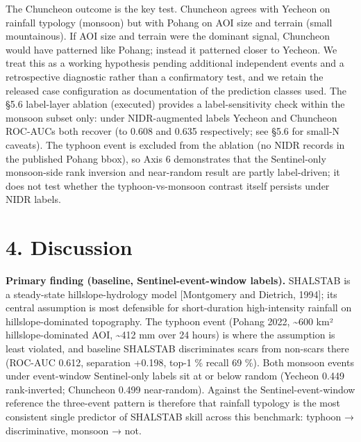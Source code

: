 \documentclass[11pt,a4paper]{article}
\begin{document}
The Chuncheon outcome is the key test. Chuncheon agrees with Yecheon on rainfall typology (monsoon) but with Pohang on AOI size and terrain (small mountainous). If AOI size and terrain were the dominant signal, Chuncheon would have patterned like Pohang; instead it patterned closer to Yecheon. We treat this as a working hypothesis pending additional independent events and a retrospective diagnostic rather than a confirmatory test, and we retain the released case configuration as documentation of the prediction classes used. The §5.6 label-layer ablation (executed) provides a label-sensitivity check within the monsoon subset only: under NIDR-augmented labels Yecheon and Chuncheon ROC-AUCs both recover (to 0.608 and 0.635 respectively; see §5.6 for small-N caveats). The typhoon event is excluded from the ablation (no NIDR records in the published Pohang bbox), so Axis 6 demonstrates that the Sentinel-only monsoon-side rank inversion and near-random result are partly label-driven; it does not test whether the typhoon-vs-monsoon contrast itself persists under NIDR labels.

\section{4. Discussion}\label{discussion}

\textbf{Primary finding (baseline, Sentinel-event-window labels).} SHALSTAB is a steady-state hillslope-hydrology model {[}Montgomery and Dietrich, 1994{]}; its central assumption is most defensible for short-duration high-intensity rainfall on hillslope-dominated topography. The typhoon event (Pohang 2022, \textasciitilde600 km² hillslope-dominated AOI, \textasciitilde412 mm over 24 hours) is where the assumption is least violated, and baseline SHALSTAB discriminates scars from non-scars there (ROC-AUC 0.612, separation +0.198, top-1 \% recall 69 \%). Both monsoon events under event-window Sentinel-only labels sit at or below random (Yecheon 0.449 rank-inverted; Chuncheon 0.499 near-random). Against the Sentinel-event-window reference the three-event pattern is therefore that rainfall typology is the most consistent single predictor of SHALSTAB skill across this benchmark: typhoon → discriminative, monsoon → not.
\end{document}
